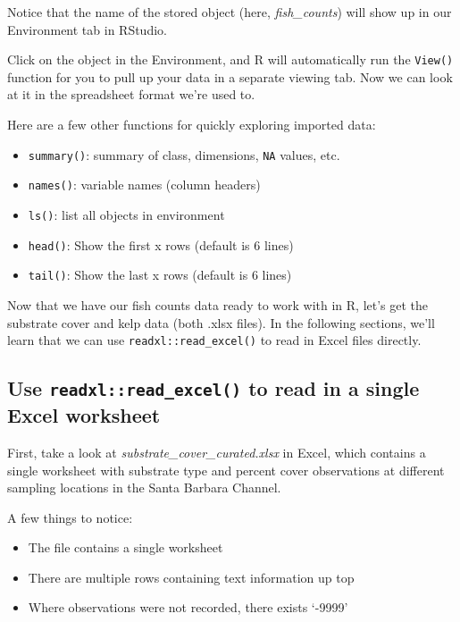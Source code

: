 \documentclass[]{book}
\providecommand{\tightlist}{%
  \setlength{\itemsep}{0pt}\setlength{\parskip}{0pt}}
\begin{document}
Notice that the name of the stored object (here, \emph{fish\_counts}) will show up in our Environment tab in RStudio.

Click on the object in the Environment, and R will automatically run the \texttt{View()} function for you to pull up your data in a separate viewing tab. Now we can look at it in the spreadsheet format we're used to.

Here are a few other functions for quickly exploring imported data:

\begin{itemize}
\tightlist
\item
  \texttt{summary()}: summary of class, dimensions, \texttt{NA} values, etc.
\item
  \texttt{names()}: variable names (column headers)
\item
  \texttt{ls()}: list all objects in environment
\item
  \texttt{head()}: Show the first x rows (default is 6 lines)
\item
  \texttt{tail()}: Show the last x rows (default is 6 lines)
\end{itemize}

Now that we have our fish counts data ready to work with in R, let's get the substrate cover and kelp data (both .xlsx files). In the following sections, we'll learn that we can use \texttt{readxl::read\_excel()} to read in Excel files directly.

\hypertarget{use-readxlread_excel-to-read-in-a-single-excel-worksheet}{%
\subsection{\texorpdfstring{Use \texttt{readxl::read\_excel()} to read in a single Excel worksheet}{Use readxl::read\_excel() to read in a single Excel worksheet}}\label{use-readxlread_excel-to-read-in-a-single-excel-worksheet}}

First, take a look at \emph{substrate\_cover\_curated.xlsx} in Excel, which contains a single worksheet with substrate type and percent cover observations at different sampling locations in the Santa Barbara Channel.

A few things to notice:

\begin{itemize}
\tightlist
\item
  The file contains a single worksheet
\item
  There are multiple rows containing text information up top
\item
  Where observations were not recorded, there exists `-9999'
\end{itemize}
\end{document}
